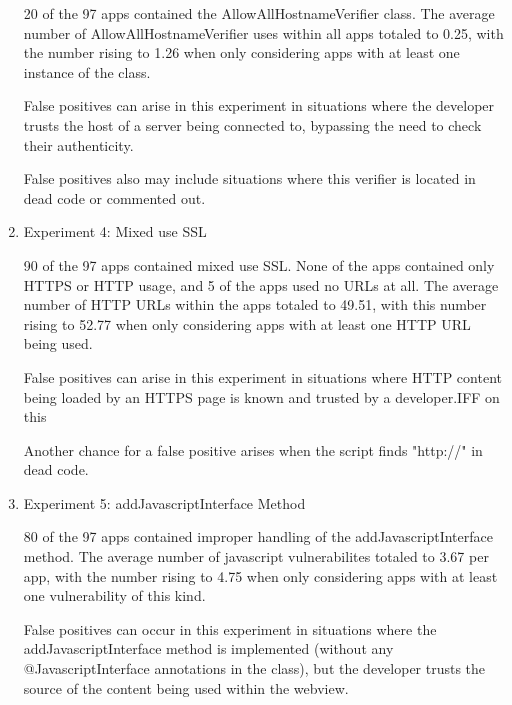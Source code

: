 \begin{enumerate}
    20 of the 97 apps contained the AllowAllHostnameVerifier class. 
    The average number of AllowAllHostnameVerifier uses within all
    apps totaled to 0.25, with the number rising to 1.26 when only
    considering apps with at least one instance of the class.

    False positives can arise in this experiment in situations where the developer trusts the host of a server being connected to, bypassing the need to check their authenticity.

    False positives also may include situations where this verifier is located in dead code or commented out.

    \item Experiment 4: Mixed use SSL
    
    90 of the 97 apps contained mixed use SSL. None of the apps 
    contained only HTTPS or HTTP usage, and 5 of the apps used no 
    URLs at all. The average number of HTTP URLs within the apps 
    totaled to 49.51, with this number rising to 52.77 when only 
    considering apps with at least one HTTP URL being used.

    False positives can arise in this experiment in situations where HTTP content being loaded by an HTTPS page is known and trusted by a developer.IFF on this 
          
    Another chance for a false positive arises when the script finds "http://" in dead code. 

    \item Experiment 5: addJavascriptInterface Method
    
    80 of the 97 apps contained improper handling of the addJavascriptInterface
    method. The average number of javascript vulnerabilites totaled to 
    3.67 per app, with the number rising to 4.75 when only considering
    apps with at least one vulnerability of this kind.

    False positives can occur in this experiment in situations where the addJavascriptInterface method is implemented (without any @JavascriptInterface annotations in the class), but the developer trusts the source of the content being used within the webview.

\end{enumerate}






